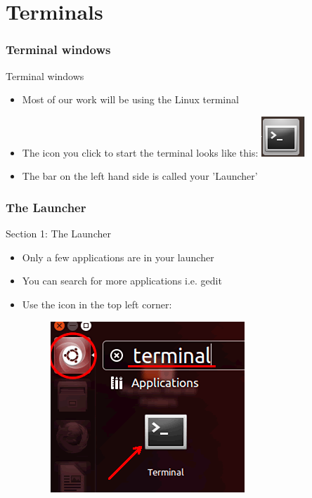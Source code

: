 \part{Terminals}
\begin{frame}
\partpage
\end{frame}

\section{Terminal windows}
\begin{frame}{Terminal windows}
\begin{itemize}
\item Most of our work will be using the Linux terminal
\item The icon you click to start the terminal looks like this:
\includegraphics{imgs/terminal-icon.png}
\item The bar on the left hand side is called your 'Launcher'
\end{itemize}
\end{frame}

\section{The Launcher}
\begin{frame}{Section 1: The Launcher}
\begin{itemize}
\item Only a few applications are in your launcher
\item You can search for more applications i.e. gedit
\item Use the icon in the top left corner:
\begin{figure}[h]
\includegraphics[height=0.3\textheight]{imgs/ubuntu-search-icon.png}
\end{figure}
\end{itemize}
\end{frame}

